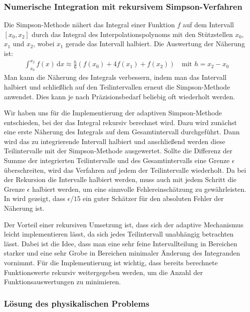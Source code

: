 \documentclass[10pt,a4paper]{article}
\begin{document}
\subsubsection{Numerische Integration mit rekursivem Simpson-Verfahren}
\label{sssec:integration}

Die Simpson-Methode nähert das Integral einer Funktion $f$ auf dem Intervall $[x_0,x_2]$ durch das Integral des Interpolationspolynoms mit den Stützstellen $x_0$, $x_1$ und $x_2$, wobei $x_1$ gerade das Intervall halbiert. Die Auswertung der Näherung ist:
\begin{align}
  \int_{x_0}^{x_2} f(x) \, \mathrm{d}x \approx \frac{h}{6} \left( f(x_0) + 4 f(x_1) + f(x_2) \right) \quad \text{mit } h = x_2 - x_0
\end{align}
Man kann die Näherung des Integrals verbessern, indem man das Intervall halbiert und schließlich auf den Teilintervallen erneut die Simpson-Methode anwendet. Dies kann je nach Präzisionsbedarf beliebig oft wiederholt werden.

Wir haben uns für die Implementierung der adaptiven Simpson-Methode entschieden, bei der das Integral rekursiv berechnet wird. Dazu wird zunächst eine erste Näherung des Integrals auf dem Gesamtintervall durchgeführt. Dann wird das zu integrierende Intervall halbiert und anschließend werden diese Teilintervalle mit der Simpson-Methode ausgewertet. Sollte die Differenz der Summe der integrierten Teilintervalle und des Gesamtintervalls eine Grenze $\epsilon$ überschreiten, wird das Verfahren auf jedem der Teilintervalle wiederholt. Da bei der Rekursion die Intervalle halbiert werden, muss auch mit jedem Schritt die Grenze $\epsilon$ halbiert werden, um eine sinnvolle Fehlereinschätzung zu gewährleisten. In \cite{lyness} wird gezeigt, dass $\epsilon / 15$ ein guter Schätzer für den absoluten Fehler der Näherung ist.

Der Vorteil einer rekursiven Umsetzung ist, dass sich der adaptive Mechanismus leicht implementieren lässt, da sich jedes Teilintervall unabhängig betrachten lässt. Dabei ist die Idee, dass man eine sehr feine Intervallteilung in Bereichen starker und eine sehr Grobe in Bereichen minimaler Änderung des Integranden vornimmt. Für die Implementierung ist wichtig, dass bereits berechnete Funktionswerte rekursiv weitergegeben werden, um die Anzahl der Funktionsauswertungen zu minimieren.


\subsubsection{Lösung des physikalischen Problems}
\end{document}
